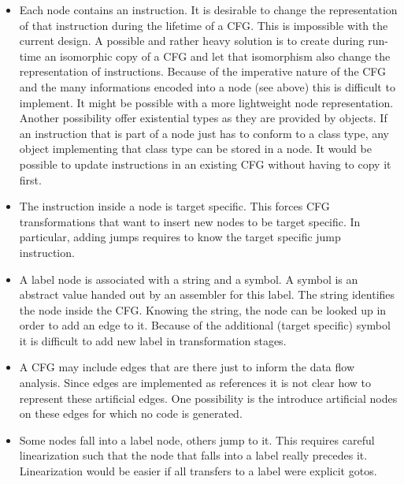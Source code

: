 \documentclass[11pt]{article}
\newcommand\CFG{{\small CFG}}
\begin{document}
\begin{itemize}
    \item Each node contains an instruction. It is desirable to change
    the representation of that instruction during the lifetime of a
    {\CFG}. This is impossible with the current design. A possible and
    rather heavy solution is to create during run-time an isomorphic
    copy of a {\CFG} and let that isomorphism also change the
    representation of instructions. Because of the imperative nature of
    the {\CFG} and the many informations encoded into a node (see above)
    this is difficult to implement. It might be possible with a more
    lightweight node representation. Another possibility offer
    existential types as they are provided by objects. If an instruction
    that is part of a node just has to conform to a class type, any
    object implementing that class type can be stored in a node. It
    would be possible to update instructions in an existing {\CFG}
    without having to copy it first.

    \item The instruction inside a node is target specific. This forces
    {\CFG} transformations that want to insert new nodes to be target
    specific. In particular, adding jumps requires to know the target
    specific jump instruction.

    \item A label node is associated with a string and a symbol. A
    symbol is an abstract value handed out by an assembler for this
    label. The string identifies the node inside the {\CFG}. Knowing the
    string, the node can be looked up in order to add an edge to it.
    Because of the additional (target specific) symbol it is difficult
    to add new label in transformation stages. 
    
    \item A {\CFG} may include edges that are there just to inform the
    data flow analysis. Since edges are implemented as references it is
    not clear how to represent these artificial edges. One possibility
    is the introduce artificial nodes on these edges for which no code
    is generated.
    
    \item Some nodes fall into a label node, others jump to it. This
    requires careful linearization such that the node that falls into a
    label really precedes it. Linearization would be easier if all
    transfers to a label were explicit gotos. 
    
    \end{itemize}
    
\end{document}
